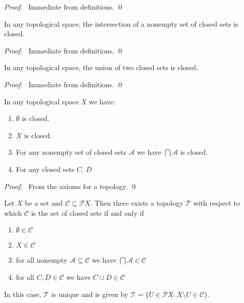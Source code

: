 \begin{proof}
\pf\ Immediate from definitions. \qed
\end{proof}

\begin{prop}
  In any topological space, the intersection of a nonempty set of closed sets is closed.
\end{prop}

\begin{proof}
\pf\ Immediate from definitions. \qed
\end{proof}

\begin{prop}
  In any topological space, the union of two closed sets is closed.
\end{prop}

\begin{proof}
  \pf\ Immediate from definitions. \qed
\end{proof}

\begin{prop} In any topological space $X$ we have:
  \begin{enumerate}
    \item
    $\emptyset$ is closed.
    \item
    $X$ is closed.
    \item
    For any nonempty set of closed sets $\mathcal{A}$ we have $\bigcap \mathcal{A}$ is closed.
    \item
    For any closed sets $C$, $D$
  \end{enumerate}
\end{prop}

\begin{proof}
  \pf\ From the axioms for a topology. \qed
\end{proof}

\begin{prop}
  \label{prop:closed}
  Let $X$ be a set and $\mathcal{C} \subseteq \mathcal{P} X$. Then there exists a topology $\mathcal{T}$ with respect to which $\mathcal{C}$ is the set of closed sets if and only if
  \begin{enumerate}
    \item
    $\emptyset \in \mathcal{C}$
    \item
    $X \in \mathcal{C}$
    \item
    for all nonempty $\mathcal{A} \subseteq \mathcal{C}$ we have $\bigcap \mathcal{A} \in \mathcal{C}$
    \item
    for all $C, D \in \mathcal{C}$ we have $C \cup D \in \mathcal{C}$
  \end{enumerate}
  In this case, $\mathcal{T}$ is unique and is given by $\mathcal{T} = \{ U \in \mathcal{P} X : X \setminus U \in \mathcal{C} \}$.
\end{prop}

